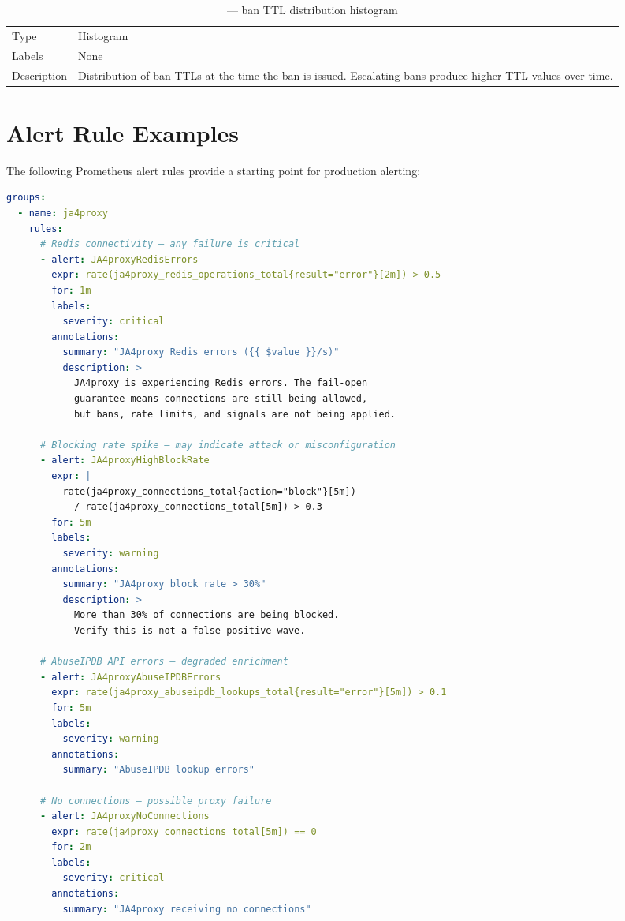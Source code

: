 \begin{fullwidth}
\begin{table}[h]
\caption{ — ban TTL distribution histogram}
\label{tab:metric-ban}
\begin{tabular}{@{}ll@{}}
\toprule
Type & Histogram \\
Labels & None \\
Description & Distribution of ban TTLs at the time the ban is issued. Escalating bans produce higher TTL values over time. \\
\bottomrule
\end{tabular}
\end{table}
\end{fullwidth}

\section{Alert Rule Examples}

The following Prometheus alert rules provide a starting point for production alerting:

\begin{lstlisting}[language=yaml]
groups:
  - name: ja4proxy
    rules:
      # Redis connectivity — any failure is critical
      - alert: JA4proxyRedisErrors
        expr: rate(ja4proxy_redis_operations_total{result="error"}[2m]) > 0.5
        for: 1m
        labels:
          severity: critical
        annotations:
          summary: "JA4proxy Redis errors ({{ $value }}/s)"
          description: >
            JA4proxy is experiencing Redis errors. The fail-open
            guarantee means connections are still being allowed,
            but bans, rate limits, and signals are not being applied.

      # Blocking rate spike — may indicate attack or misconfiguration
      - alert: JA4proxyHighBlockRate
        expr: |
          rate(ja4proxy_connections_total{action="block"}[5m])
            / rate(ja4proxy_connections_total[5m]) > 0.3
        for: 5m
        labels:
          severity: warning
        annotations:
          summary: "JA4proxy block rate > 30%"
          description: >
            More than 30% of connections are being blocked.
            Verify this is not a false positive wave.

      # AbuseIPDB API errors — degraded enrichment
      - alert: JA4proxyAbuseIPDBErrors
        expr: rate(ja4proxy_abuseipdb_lookups_total{result="error"}[5m]) > 0.1
        for: 5m
        labels:
          severity: warning
        annotations:
          summary: "AbuseIPDB lookup errors"

      # No connections — possible proxy failure
      - alert: JA4proxyNoConnections
        expr: rate(ja4proxy_connections_total[5m]) == 0
        for: 2m
        labels:
          severity: critical
        annotations:
          summary: "JA4proxy receiving no connections"
\end{lstlisting}

